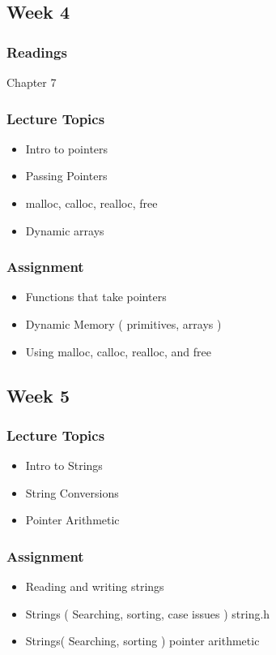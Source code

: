 \documentclass[a4paper,12pt]{report}
\begin{document}
\subsection*{Week 4}
\subsubsection*{ Readings }
Chapter 7
\subsubsection*{Lecture Topics}
\begin{itemize}
\item Intro to pointers
\item Passing Pointers
\item malloc, calloc, realloc, free
\item Dynamic arrays
\end{itemize}
\subsubsection*{Assignment}
\begin{itemize}
\item Functions that take pointers
\item Dynamic Memory ( primitives, arrays )
\item Using malloc, calloc, realloc, and free
\end{itemize}

\subsection*{Week 5}
\subsubsection*{Lecture Topics}
\begin{itemize}
\item Intro to Strings
\item String Conversions
\item Pointer Arithmetic 
\end{itemize}
\subsubsection*{Assignment}
\begin{itemize}
\item Reading and writing strings
\item Strings ( Searching, sorting, case issues ) string.h
\item Strings( Searching, sorting ) pointer arithmetic
\end{itemize}
\end{document}
